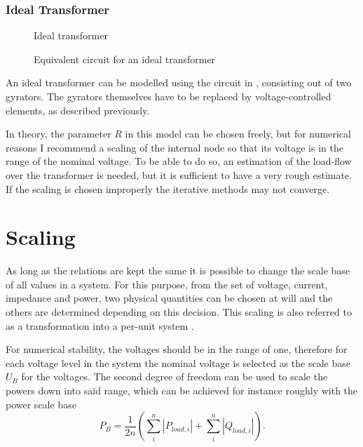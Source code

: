 \subsubsection{Ideal Transformer}

\begin{figure}
	\centering
	
	\caption{Ideal transformer}
	\label{fig:ideal_transformer_original}
\end{figure}

\begin{figure}
	\centering
	
	\caption{Equivalent circuit for an ideal transformer}
	\label{fig:ideal_transformer_equivalent}
\end{figure}

An ideal transformer  can be modelled using the circuit in , consisting out of two gyrators. The gyrators themselves have to be replaced by voltage-controlled elements, as described previously.

In theory, the parameter $R$ in this model can be chosen freely, but for numerical reasons I recommend a scaling of the internal node so that its voltage is in the range of the nominal voltage. To be able to do so, an estimation of the load-flow over the transformer is needed, but it is sufficient to have a very rough estimate. If the scaling is chosen improperly the iterative methods may not converge.

\section{Scaling}
\label{sec:scaling}

As long as the relations are kept the same it is possible to change the scale base of all values in a system. For this purpose, from the set of voltage, current, impedance and power, two physical quantities can be chosen at will and the others are determined depending on this decision. This scaling is also referred to as a transformation into a per-unit system \citep[p. 90]{powerSystemAnalysis}.

For numerical stability, the voltages should be in the range of one, therefore for each voltage level in the system the nominal voltage is selected as the scale base $U_B$ for the voltages. The second degree of freedom can be used to scale the powers down into said range, which can be achieved for instance roughly with the power scale base
\begin{equation}
	P_B = \frac{1}{2n} \left( \sum_{i}^n \left| P_{load,i} \right| + \sum_{i}^n \left| Q_{load,i} \right| \right).
\end{equation}

